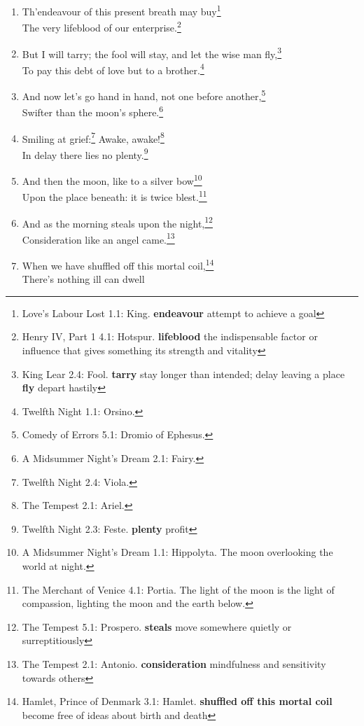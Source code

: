 \documentclass[17pt,twoside]{extarticle}
\begin{document}
\begin{enumerate}
{    You Like It 3.2: Touchstone. \textbf{spare} frugal \textbf{humour}
    temperament}\\With smiling plenty, and fair prosperous
  days!\footnote{Richard III 5.5: Richmond.}
\item
  Th'endeavour of this present breath may buy\footnote{Love's Labour
    Lost 1.1: King. \textbf{endeavour} attempt to achieve a goal}\\The
  very lifeblood of our enterprise.\footnote{Henry IV, Part 1 4.1:
    Hotspur. \textbf{lifeblood} the indispensable factor or influence
    that gives something its strength and vitality}
\item
  But I will tarry; the fool will stay, and let the wise man
  fly,\footnote{King Lear 2.4: Fool. \textbf{tarry} stay longer than
    intended; delay leaving a place \textbf{fly} depart hastily}\\To pay
  this debt of love but to a brother.\footnote{Twelfth Night 1.1:
    Orsino.}
\item
  And now let's go hand in hand, not one before another,\footnote{Comedy
    of Errors 5.1: Dromio of Ephesus.}\\Swifter than the moon's
  sphere.\footnote{A Midsummer Night's Dream 2.1: Fairy.}
\item
  Smiling at grief:\footnote{Twelfth Night 2.4: Viola.} Awake,
  awake!\footnote{The Tempest 2.1: Ariel.}\\In delay there lies no
  plenty.\footnote{Twelfth Night 2.3: Feste. \textbf{plenty} profit}
\item
  And then the moon, like to a silver bow\footnote{A Midsummer Night's
    Dream 1.1: Hippolyta. The moon overlooking the world at night.}\\Upon
  the place beneath: it is twice blest.\footnote{The Merchant of Venice
    4.1: Portia. The light of the moon is the light of compassion,
    lighting the moon and the earth below.}
\item
  And as the morning steals upon the night,\footnote{The Tempest 5.1:
    Prospero. \textbf{steals} move somewhere quietly or surreptitiously}\\Consideration
  like an angel came.\footnote{The Tempest 2.1: Antonio.
    \textbf{consideration} mindfulness and sensitivity towards others}
\item
  When we have shuffled off this mortal coil,\footnote{Hamlet, Prince of
    Denmark 3.1: Hamlet. \textbf{shuffled off this mortal coil} become
    free of ideas about birth and death}\\There's nothing ill can dwell

\end{enumerate}
\end{document}

